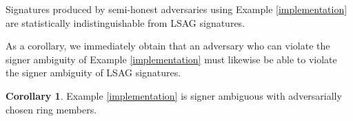 \documentclass{iacrtrans}
\theoremstyle{definition}
\numberwithin{theorem}{subsection}
\numberwithin{lemma}{theorem}
\newtheorem{cor}[theorem]{Corollary}
\newtheorem{defn}[theorem]{Definition}
\newcommand{\adversary}{\mathcal{A}}
\begin{document}
\begin{lemma}
Signatures produced by semi-honest adversaries using Example \ref{implementation} are statistically indistinguishable from LSAG signatures.
\end{lemma}
As a corollary, we immediately obtain that an adversary who can violate the signer ambiguity of Example \ref{implementation} must likewise be able to violate the signer ambiguity of LSAG signatures.
\begin{cor}
Example \ref{implementation} is signer ambiguous with adversarially chosen ring members.
\end{cor}



\end{document}
